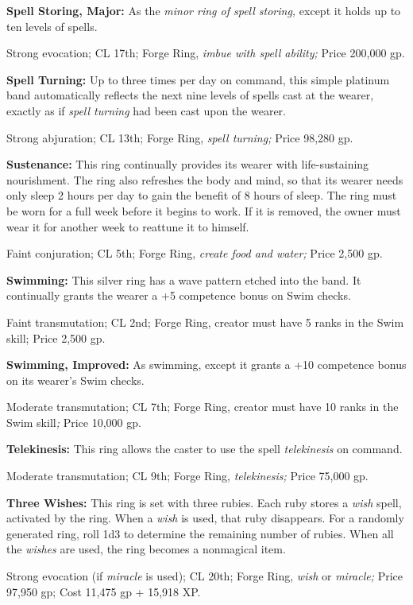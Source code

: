 \documentclass{article}
\begin{document}
\textbf{Spell Storing, Major:} As the \textit{minor ring of spell storing, }except 
it holds up to ten levels of spells.

Strong evocation; CL 17th; Forge Ring, \textit{imbue with spell ability; }Price 
200,000 gp.

\textbf{Spell Turning:} Up to three times per day on command, this simple platinum 
band automatically reflects the next nine levels of spells cast at the wearer, 
exactly as if \textit{spell turning }had been cast upon the wearer.

Strong abjuration; CL 13th; Forge Ring, \textit{spell turning; }Price 98,280 gp.

\textbf{Sustenance: }This ring continually provides its wearer with life-sustaining 
nourishment. The ring also refreshes the body and mind, so that its wearer needs 
only sleep 2 hours per day to gain the benefit of 8 hours of sleep. The ring must 
be worn for a full week before it begins to work. If it is removed, the owner must 
wear it for another week to reattune it to himself.

Faint conjuration; CL 5th; Forge Ring, \textit{create food and water; }Price 2,500 
gp.

\textbf{Swimming:} This silver ring has a wave pattern etched into the band. It 
continually grants the wearer a +5 competence bonus on Swim checks.

Faint transmutation; CL 2nd; Forge Ring, creator must have 5 ranks in the Swim 
skill; Price 2,500 gp.

\textbf{Swimming, Improved:} As swimming, except it grants a +10 competence bonus 
on its wearer's Swim checks.

Moderate transmutation; CL 7th; Forge Ring, creator must have 10 ranks in the Swim 
skill\textit{; }Price 10,000 gp.

\textbf{Telekinesis: }This ring allows the caster to use the spell \textit{telekinesis 
}on command.

Moderate transmutation; CL 9th; Forge Ring, \textit{telekinesis; }Price 75,000 
gp.

\textbf{Three Wishes:} This ring is set with three rubies. Each ruby stores a \textit{wish 
}spell, activated by the ring. When a \textit{wish }is used, that ruby disappears. 
For a randomly generated ring, roll 1d3 to determine the remaining number of rubies. 
When all the \textit{wishes }are used, the ring becomes a nonmagical item.

Strong evocation (if \textit{miracle }is used); CL 20th; Forge Ring, \textit{wish 
}or \textit{miracle; }Price 97,950 gp; Cost 11,475 gp + 15,918 XP.
\end{document}
